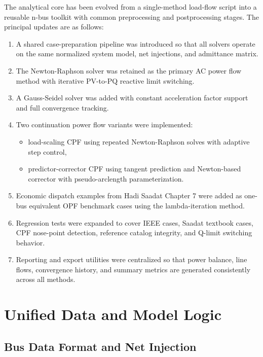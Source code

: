 \documentclass[12pt,a4paper]{article}
\begin{document}
The analytical core has been evolved from a single-method load-flow script into a reusable n-bus toolkit with common preprocessing and postprocessing stages. The principal updates are as follows:

\begin{enumerate}[leftmargin=1.5em]
    \item A shared case-preparation pipeline was introduced so that all solvers operate on the same normalized system model, net injections, and admittance matrix.
    \item The Newton-Raphson solver was retained as the primary AC power flow method with iterative PV-to-PQ reactive limit switching.
    \item A Gauss-Seidel solver was added with constant acceleration factor support and full convergence tracking.
    \item Two continuation power flow variants were implemented:
    \begin{itemize}[leftmargin=1.5em]
        \item load-scaling CPF using repeated Newton-Raphson solves with adaptive step control,
        \item predictor-corrector CPF using tangent prediction and Newton-based corrector with pseudo-arclength parameterization.
    \end{itemize}
    \item Economic dispatch examples from Hadi Saadat Chapter 7 were added as one-bus equivalent OPF benchmark cases using the lambda-iteration method.
    \item Regression tests were expanded to cover IEEE cases, Saadat textbook cases, CPF nose-point detection, reference catalog integrity, and Q-limit switching behavior.
    \item Reporting and export utilities were centralized so that power balance, line flows, convergence history, and summary metrics are generated consistently across all methods.
\end{enumerate}

\section{Unified Data and Model Logic}

\subsection{Bus Data Format and Net Injection}
\end{document}
